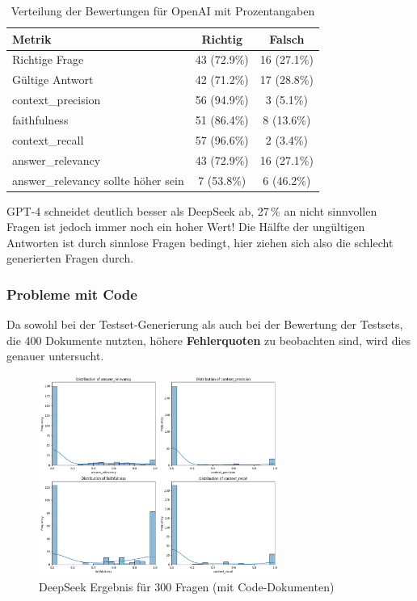 \begin{table}[h!]
    \centering
    \begin{tabular}{|l|c|c|}
    \hline
    \textbf{Metrik} & \textbf{Richtig} & \textbf{Falsch} \\
    \hline
    Richtige Frage                        & 43 (72.9\%) & 16 (27.1\%) \\
    Gültige Antwort                       & 42 (71.2\%) & 17 (28.8\%) \\
    context\_precision           & 56 (94.9\%) & 3 (5.1\%) \\
    faithfulness                 & 51 (86.4\%) & 8 (13.6\%) \\
    context\_recall              & 57 (96.6\%) & 2 (3.4\%) \\
    answer\_relevancy            & 43 (72.9\%) & 16 (27.1\%) \\
    answer\_relevancy sollte höher sein  & 7 (53.8\%)  & 6 (46.2\%) \\
    \hline
    \end{tabular}
    \caption{Verteilung der Bewertungen für OpenAI mit Prozentangaben}
\end{table}

GPT-4 schneidet deutlich besser als DeepSeek ab, 27\,\% an nicht sinnvollen Fragen ist jedoch immer noch ein hoher Wert!
Die Hälfte der ungültigen Antworten ist durch sinnlose Fragen bedingt, hier ziehen sich also die schlecht generierten Fragen durch.

\subsubsection{Probleme mit Code}
Da sowohl bei der Testset-Generierung als auch bei der Bewertung der Testsets, die 400 Dokumente nutzten, höhere \textbf{Fehlerquoten} zu beobachten sind, wird dies genauer untersucht.

\begin{figure}[htbp]
    \centering
    \includegraphics[width=0.7\textwidth]{images/3_3_code_invest_D_D.png}
    \caption{DeepSeek Ergebnis für 300 Fragen (mit Code-Dokumenten)}
    \label{fig:deepseek_code}
\end{figure}

